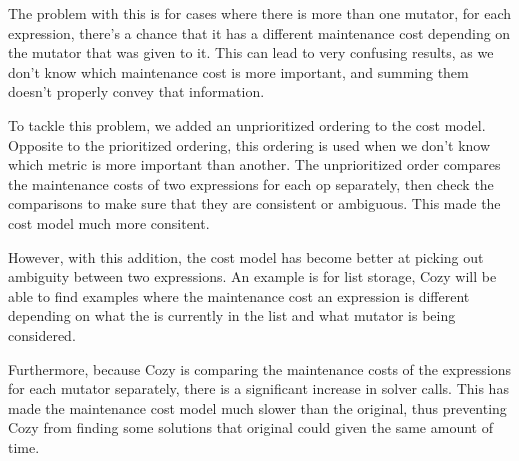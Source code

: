 The problem with this is for cases where there is more than one mutator, for
each expression, there's a chance that it has a different maintenance cost
depending on the mutator that was given to it.  This can lead to very confusing
results, as we don't know which maintenance cost is more important, and summing
them doesn't properly convey that information.

To tackle this problem, we added an unprioritized ordering to the cost model.
Opposite to the prioritized ordering, this ordering is used when we don't know
which metric is more important than another. The unprioritized order compares
the maintenance costs of two expressions for each op separately, then check the
comparisons to make sure that they are consistent or ambiguous. This made the
cost model much more consitent.

However, with this addition, the cost model has become better at picking out
ambiguity between two expressions. An example is for list storage, Cozy
will be able to find examples where the maintenance cost an expression is
different depending on what the is currently in the list and what mutator is
being considered.

Furthermore, because Cozy is comparing the maintenance costs of the expressions
for each mutator separately, there is a significant increase in solver calls.
This has made the maintenance cost model much slower than the original, thus
preventing Cozy from finding some solutions that original could given the same
amount of time.
